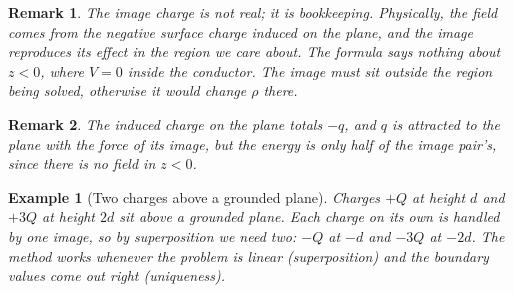 \documentclass{article}
\newtheorem*{example}{Example}
\newtheorem{remark}{Remark}
\begin{document}
\begin{remark}
    The image charge is not real; it is bookkeeping. Physically, the field comes from the negative surface charge induced on the plane, and the image reproduces its effect in the region we care about. The formula says nothing about $z < 0$, where $V = 0$ inside the conductor. The image must sit outside the region being solved, otherwise it would change $\rho$ there.
\end{remark}
\begin{remark}
    The induced charge on the plane totals $-q$, and $q$ is attracted to the plane with the force of its image, but the energy is only half of the image pair's, since there is no field in $z < 0$.
\end{remark}
\begin{example}[Two charges above a grounded plane]
    Charges $+Q$ at height $d$ and $+3Q$ at height $2d$ sit above a grounded plane. Each charge on its own is handled by one image, so by superposition we need two: $-Q$ at $-d$ and $-3Q$ at $-2d$. The method works whenever the problem is linear (superposition) and the boundary values come out right (uniqueness).
\end{example}
\end{document}
